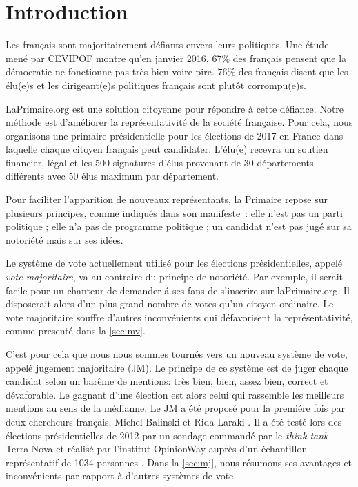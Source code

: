 \documentclass[conference]{IEEEtran}
\begin{document}



\section{Introduction}
\label{sec:intro}

Les fran\c{c}ais sont majoritairement d\'efiants envers leurs politiques. 
Une \'etude men\'e par CEVIPOF \cite{cevipof2016} montre qu'en janvier 2016, $67\%$ des fran\c{c}ais pensent que la d\'emocratie ne fonctionne pas tr\`es bien voire pire. $76\%$ des fran\c{c}ais disent que les \'elu(e)s et les dirigeant(e)s politiques fran\c{c}ais sont plut\^ot corrompu(e)s. 

LaPrimaire.org est une solution citoyenne pour r\'epondre \`a cette d\'efiance. 
Notre m\'ethode est d'am\'eliorer la repr\'esentativit\'e de la soci\'et\'e fran\c{c}aise. Pour cela, nous organisons une primaire pr\'esidentielle pour les \'elections de 2017 en France dans laquelle chaque citoyen fran\c{c}ais peut candidater. L'\'elu(e) recevra un soutien financier, l\'egal et les 500 signatures d'\'elus provenant de 30 d\'epartements diff\'erents avec 50 \'elus maximum par d\'epartement.

Pour faciliter l'apparition de nouveaux repr\'esentants, la Primaire repose sur plusieurs principes, comme indiqu\'es dans son manifeste~\cite{manifeste}: elle n'est pas un parti politique ; elle n'a pas de programme politique ; un candidat n'est pas jug\'e sur sa notori\'et\'e mais sur ses id\'ees.

Le syst\`eme de vote actuellement utilis\'e pour les \'elections pr\'esidentielles, appel\'e \emph{vote majoritaire}, va au contraire du principe de notori\'et\'e. Par exemple, il serait facile pour un chanteur de demander \'a ses fans de s'inscrire sur laPrimaire.org. Il disposerait alors d'un plus grand nombre de votes qu'un citoyen ordinaire. Le vote majoritaire souffre d'autres inconv\'enients qui d\'efavorisent la repr\'esentativit\'e, comme present\'e dans la \cref{sec:mv}. 

C'est pour cela que nous nous sommes tourn\'es vers un nouveau syst\`eme de vote, appel\'e jugement majoritaire (JM). Le principe de ce syst\`eme est de juger chaque candidat selon un bar\^eme de mentions: tr\`es bien, bien, assez bien, correct et d\'evaforable. Le gagnant d'une \'election est alors celui qui rassemble les meilleurs mentions au sens de la m\'edianne.  Le JM a \'et\'e propos\'e pour la premi\'ere fois par deux chercheurs fran\c{c}ais, Michel Balinski et Rida Laraki \cite{balinski2010majority}.  Il a \'et\'e test\'e lors des \'elections pr\'esidentielles de 2012 par un sondage command\'e par le \emph{think tank} Terra Nova  et r\'ealis\'e par l'institut OpinionWay aupr\`es d'un \'echantillon repr\'esentatif de 1034 personnes \cite{balinski2012rendre}. Dans la \cref{sec:mj}, nous r\'esumons ses avantages et inconv\'enients par rapport \`a d'autres syst\`emes de vote. 
\end{document}
